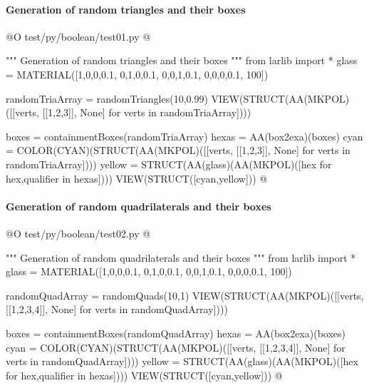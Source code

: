 \documentclass[11pt,oneside]{article}    %
\begin{document}
\paragraph{Generation of random triangles and their boxes}
@O test/py/boolean/test01.py
@{""" Generation of random triangles and their boxes """
from larlib import *
glass = MATERIAL([1,0,0,0.1,  0,1,0,0.1,  0,0,1,0.1, 0,0,0,0.1, 100])

randomTriaArray = randomTriangles(10,0.99)
VIEW(STRUCT(AA(MKPOL)([[verts, [[1,2,3]], None] for verts in randomTriaArray])))

boxes = containmentBoxes(randomTriaArray)
hexas = AA(box2exa)(boxes)
cyan = COLOR(CYAN)(STRUCT(AA(MKPOL)([[verts, [[1,2,3]], None] for verts in randomTriaArray])))
yellow = STRUCT(AA(glass)(AA(MKPOL)([hex for hex,qualifier in hexas])))
VIEW(STRUCT([cyan,yellow]))
@}


\paragraph{Generation of random quadrilaterals and their boxes}
@O test/py/boolean/test02.py
@{""" Generation of random quadrilaterals and their boxes """
from larlib import *
glass = MATERIAL([1,0,0,0.1,  0,1,0,0.1,  0,0,1,0.1, 0,0,0,0.1, 100])

randomQuadArray = randomQuads(10,1)
VIEW(STRUCT(AA(MKPOL)([[verts, [[1,2,3,4]], None] for verts in randomQuadArray])))

boxes = containmentBoxes(randomQuadArray)
hexas = AA(box2exa)(boxes)
cyan = COLOR(CYAN)(STRUCT(AA(MKPOL)([[verts, [[1,2,3,4]], None] for verts in randomQuadArray])))
yellow = STRUCT(AA(glass)(AA(MKPOL)([hex for hex,qualifier in hexas])))
VIEW(STRUCT([cyan,yellow]))
@}
\end{document}
